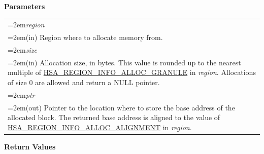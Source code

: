 \documentclass[final,oneside]{book}
\newcommand{\refarg}[1]{\textit{#1}}
\begin{document}
\noindent\textbf{Parameters}\\[-6mm]
\noindent\begin{longtable}{@{}>{\hangindent=2em}p{\textwidth}}
\refarg{region}\\\hspace{2em}(in) Region where to allocate memory from.\\[2mm]
\refarg{size}\\\hspace{2em}(in) Allocation size, in bytes. This value is rounded up to the nearest multiple of \hyperlink{group__memory_1ggad35755078ff15f645c6c25e7f7ef2707ab602c01f90962314de88fb887b6f13b3}{HSA_\-REGION_\-INFO_\-ALLOC_\-GRANULE} in \textit{region}. Allocations of size 0 are allowed and return a NULL pointer.\\[2mm]
\refarg{ptr}\\\hspace{2em}(out) Pointer to the location where to store the base address of the allocated block. The returned base address is aligned to the value of \hyperlink{group__memory_1ggad35755078ff15f645c6c25e7f7ef2707af3103bc1328080b236a7847f1bf4998e}{HSA_\-REGION_\-INFO_\-ALLOC_\-ALIGNMENT} in \textit{region}.
\end{longtable}
\vspace{-5mm}\noindent\textbf{Return Values}\\[-6mm]
\end{document}
